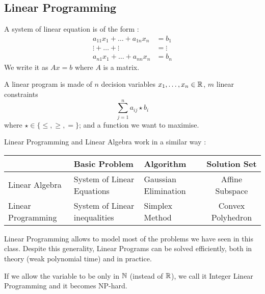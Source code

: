 \documentclass[12pt]{cours}
\begin{document}
\subsection{Linear Programming}
\begin{definition}
    A system of linear equation is of the form :
    \[
        \begin{aligned}
            a_{11} x_{1} + \ldots + a_{1n} x_{n} &= b_{1}\\
            \vdots + \ldots + \vdots &= \vdots \\
            a_{n1}x_{1} + \ldots + a_{nn}x_{n} &= b_{n}
        \end{aligned}
    \]
    We write it as $Ax = b$ where $A$ is a matrix.
\end{definition}
\begin{definition}
    A linear program is made of $n$ decision variables $x_{1}, \ldots, x_{n} \in \mathbb{R}$, $m$ linear constraints
    \[
        \sum_{j = 1}^{n} a_{ij} \star b_{i}
    \]
    where $\star \in \{\leq, \geq, =\}$; and a function we want to maximise.
\end{definition}

\begin{proposition}
    Linear Programming and Linear Algebra work in a similar way :
    \begin{center}
        \begin{tabular}{p{}p{}p{}c}
            & Basic Problem & Algorithm & Solution Set\\
            \midrule
            Linear \newline Algebra & System of \newline Linear Equations & Gaussian Elimination & Affine Subspace\\
            \midrule
            Linear \newline Programming & System of \newline Linear inequalities & Simplex Method & Convex Polyhedron
        \end{tabular}
    \end{center}
\end{proposition}

Linear Programming allows to model most of the problems we have seen in this class. Despite this generality, Linear Programs can be solved efficiently, both in theory (weak polynomial time) and in practice.
\begin{definition}
    If we allow the variable to be only in $\mathbb{N}$ (instead of $\mathbb{R}$), we call it Integer Linear Programming and it becomes NP-hard.
\end{definition}
\end{document}
